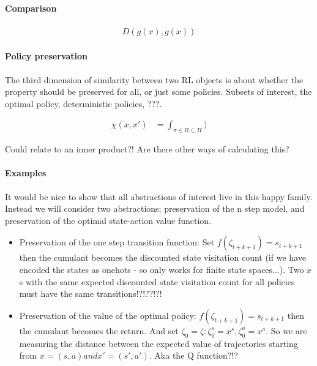 \paragraph{Comparison}


\begin{align*}
D(g(x), g(x))
\end{align*}

\paragraph{Policy preservation}

The third dimension of similarity between two RL objects is about whether the
property should be preserved for all, or just some policies. Subsets of interest, the optimal policy, deterministic policies, ???.

\begin{align*}
\chi(x, x') &= \int_{\pi \in B\subset \Pi} )
\end{align*}

Could relate to an inner product?! Are there other ways of calculating this?



\paragraph{Examples}

It would be nice to show that all abstractions of interest live in this happy family.
Instead we will consider two abstractions; preservation of the n step model, and
preservation of the optimal state-action value function.


\begin{itemize}
  \tightlist
  \item Preservation of the one step transition function: Set $f(\zeta_{t+k+1}) = s_{t+k+1}$ then the cumulant becomes the discounted state visitation count (if we have encoded the states as onehots - so only works for finite state spaces...). Two $x$s with the same expected discounted state visitation count for all policies must have the same transitions!?!??!?!
  \item Preservation of the value of the optimal policy: $f(\zeta_{t+k+1}) = s_{t+k+1}$ then the cumulant becomes the return. And set $\zeta_0 = {\zeta: \zeta_0^s = x^s, \zeta_0^a = x^a }$. So we are measuring the distance between the expected value of trajectories starting from $x = (s, a) and x' = (s', a')$. Aka the Q function?!?
\end{itemize}

